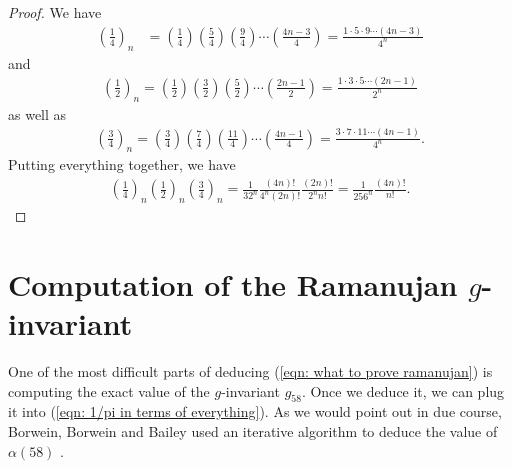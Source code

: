 \documentclass[11pt]{amsart}
\theoremstyle{definition}
\numberwithin{theorem}{section}
\begin{document}
\begin{proof}
We have \begin{align*}
    \left(\frac{1}{4}\right)_n&=\left(\frac{1}{4}\right)\left(\frac{5}{4}\right)\left(\frac{9}{4}\right)\cdots \left(\frac{4n-3}{4}\right)=\frac{1\cdot 5 \cdot 9 \cdots \left(4n-3\right)}{4^n}
\end{align*}
and \begin{align*}
    \left(\frac{1}{2}\right)_n=\left(\frac{1}{2}\right)\left(\frac{3}{2}\right)\left(\frac{5}{2}\right)\cdots\left(\frac{2n-1}{2}\right)=\frac{1\cdot 3\cdot 5\cdots  \left(2n-1\right)}{2^n}
\end{align*}
as well as \begin{align*}
\left(\frac{3}{4}\right)_n=\left(\frac{3}{4}\right)\left(\frac{7}{4}\right)\left(\frac{11}{4}\right)\cdots \left(\frac{4n-1}{4}\right)=\frac{3\cdot 7 \cdot 11 \cdots\left(4n-1\right)}{4^n}.
\end{align*}
Putting everything together, we have
\begin{align*}
\left(\frac{1}{4}\right)_n\left(\frac{1}{2}\right)_n\left(\frac{3}{4}\right)_n=\frac{1}{32^n} \frac{\left(4n\right)!}{4^n\left(2n\right)!} \frac{\left(2n\right)!}{2^nn!}=\frac{1}{256^n} \frac{\left(4n\right)!}{n!}.
\end{align*}
\end{proof}
\section{Computation of the Ramanujan $g$-invariant}
One of the most difficult parts of deducing (\ref{eqn: what to prove ramanujan}) is computing the exact value of the $g$-invariant $g_{58}$. Once we deduce it, we can plug it into (\ref{eqn: 1/pi in terms of everything}). As we would point out in due course, Borwein, Borwein and Bailey used an iterative algorithm to deduce the value of $\alpha\left(58\right)$ \cite{Borwein Pi Alpha}.
\end{document}
